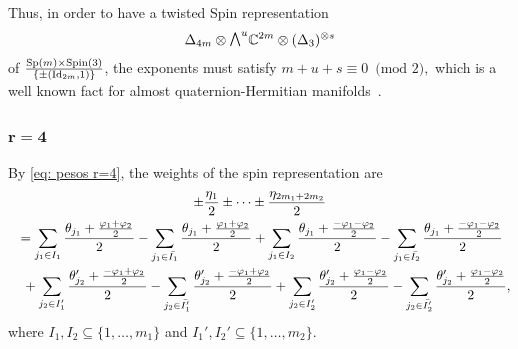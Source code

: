 \documentclass[pdftex]{sigma}
\newcommand{\ext}{\raise1pt\hbox{$\textstyle\bigwedge$}}
\numberwithin{equation}{section}
\begin{document}
Thus, in order to have a twisted Spin representation
\begin{gather*}\Delta_{4m}\otimes \ext^u \mathbb{C}^{2m}\otimes (\Delta_3)^{\otimes s}\end{gather*}
of ${{\rm Sp}(m)\times {\rm Spin}(3)\over \{\pm ({\rm Id}_{2m},1)\}}$, the exponents must satisfy $m+u+s\equiv 0 \,\,\,\mbox{(mod 2)},$ which is a well known fact for almost quaternion-Hermitian manifolds~\cite{SalPitman}.

\subsubsection[$r=4$]{$\boldsymbol{r=4}$}

By \eqref{eq: pesos r=4}, the weights of the spin representation are
\begin{gather*}
 \pm {\eta_1\over 2} \pm \cdots \pm {\eta_{2m_1+2m_2}\over 2}\\
{}= \sum_{j_1\in I_1} {\theta_{j_1}+{\varphi_1+\varphi_2\over 2}\over 2} - \sum_{j_1\in \bar{I_1}} {\theta_{j_1}+{\varphi_1+\varphi_2\over 2}\over 2}
+ \sum_{j_1\in I_2} {\theta_{j_1}+{-\varphi_1-\varphi_2\over 2}\over 2} - \sum_{j_1\in \bar{I_2}} {\theta_{j_1}+{-\varphi_1-\varphi_2\over 2}\over 2} \\
\quad{} + \sum_{j_2\in I_1'} {\theta_{j_2}'+{-\varphi_1+\varphi_2\over 2}\over 2} - \sum_{j_2\in \bar{I_1'}} {\theta_{j_2}'+{-\varphi_1+\varphi_2\over 2}\over 2}
 + \sum_{j_2\in I_2'} {\theta_{j_2}'+{\varphi_1-\varphi_2\over 2}\over 2} - \sum_{j_2\in \bar{I_2'}} {\theta_{j_2}'+{\varphi_1-\varphi_2\over 2}\over 2} ,
\end{gather*}
where $I_1,I_2\subseteq \{1,\dots,m_1\}$ and $I_1',I_2'\subseteq \{1,\dots,m_2\}$.
\end{document}
